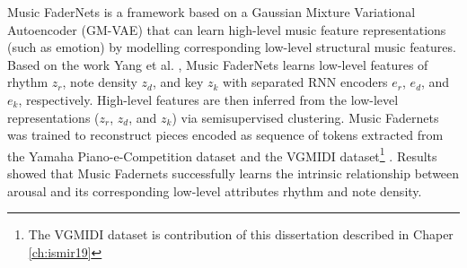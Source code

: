 Music FaderNets \cite{tan2020music} is a framework based on a Gaussian Mixture Variational Autoencoder (GM-VAE) that can learn high-level music feature representations (such as emotion) by modelling corresponding low-level structural music features. Based on the work Yang et al. \cite{yang2019deep}, Music FaderNets learns low-level features of rhythm $z_r$, note density $z_d$, and key $z_k$ with separated RNN encoders $e_r$, $e_d$, and $e_k$,  respectively. High-level features are then inferred from the low-level representations ($z_r$, $z_d$, and $z_k$) via semisupervised clustering. Music Fadernets was trained to reconstruct pieces encoded as sequence of tokens \cite{oore2017learning} extracted from the Yamaha Piano-e-Competition dataset \cite{yamahaEPiano} and the VGMIDI dataset\footnote{The VGMIDI dataset is contribution of this dissertation described in Chaper \ref{ch:ismir19}} \cite{ferreira_2019}. Results showed that Music Fadernets successfully learns the intrinsic relationship between arousal and its corresponding low-level attributes rhythm and note density.



